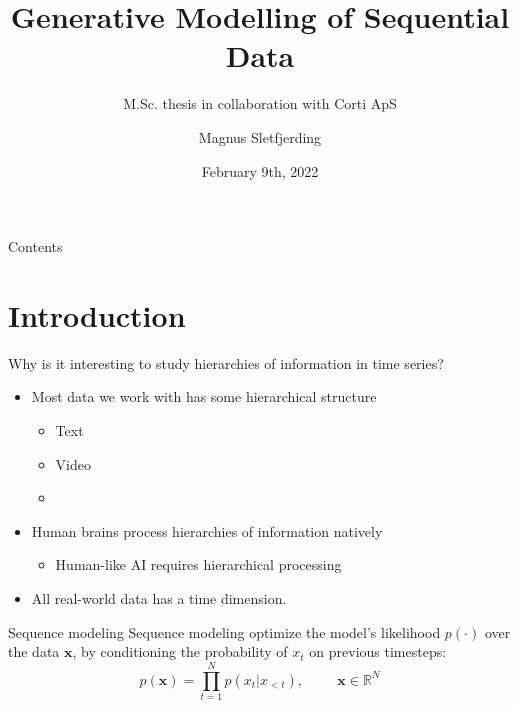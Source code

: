 \documentclass[
  ignorenonframetext,
]{beamer}
\title{Generative Modelling of Sequential Data}
\subtitle{M.Sc. thesis in collaboration with Corti ApS}
\author{Magnus Sletfjerding}
\date{February 9th, 2022}
\providecommand{\tightlist}{%
  \setlength{\itemsep}{0pt}\setlength{\parskip}{0pt}}
\begin{document}
\frame{\titlepage}

\begin{frame}{Contents}
\protect\hypertarget{contents}{}
\tableofcontents
\end{frame}

\hypertarget{introduction}{%
\section{Introduction}\label{introduction}}

\begin{frame}{Why is it interesting to study hierarchies of information
in time series?}
\protect\hypertarget{why-is-it-interesting-to-study-hierarchies-of-information-in-time-series}{}
\begin{itemize}
\item
  Most data we work with has some hierarchical structure

  \begin{itemize}
  \tightlist
  \item
    Text
  \item
    Video
  \item
  \end{itemize}
\item
  Human brains process hierarchies of information natively

  \begin{itemize}
  \tightlist
  \item
    Human-like AI requires hierarchical processing
  \end{itemize}
\item
  All real-world data has a time dimension.
\end{itemize}
\end{frame}

\begin{frame}{Sequence modeling}
\protect\hypertarget{sequence-modeling}{}
Sequence modeling optimize the model's likelihood \(p(\cdot)\) over the
data \(\mathbf{x}\), by conditioning the probability of \(x_t\) on
previous timesteps: \[
p(\mathbf{x}) = \prod^N_{t=1}  p(x_t | x_{<t}) , \hspace{1cm}  \mathbf{x}\in \mathbb{R}^N
\]
\end{frame}
\end{document}

